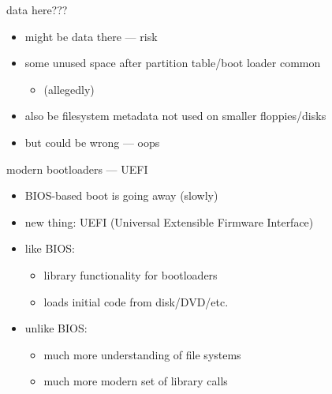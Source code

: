 \begin{frame}{data here???}
    \begin{itemize}
        \item might be data there --- risk
        \item some unused space after partition table/boot loader common
            \begin{itemize}
            \item (allegedly)
            \end{itemize}
        \item also be filesystem metadata not used on smaller floppies/disks
        \vspace{.5cm}
        \item but could be wrong --- oops
    \end{itemize}
\end{frame}

\begin{frame}{modern bootloaders --- UEFI}
    \begin{itemize}
    \item BIOS-based boot is going away (slowly)
    \item new thing: UEFI (Universal Extensible Firmware Interface)
    \item like BIOS:
        \begin{itemize}
        \item library functionality for bootloaders
        \item loads initial code from disk/DVD/etc.
        \end{itemize}
    \item unlike BIOS:
        \begin{itemize}
        \item much more understanding of file systems
        \item much more modern set of library calls
        \end{itemize}
    \end{itemize}
\end{frame}


